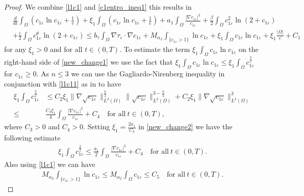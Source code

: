 \documentclass[a4paper,10pt]{article}
\theoremstyle{definition}
\begin{document}
\begin{proof}
 We combine \eqref{l1c1} and \eqref{c1entro_ineq1} this results in
\begin{align}
\label{new_change1}
   & \nonumber  \frac{d}{dt} \int_\Omega \left(c_{1\varepsilon} \ln c_{1\varepsilon} + \tfrac{1}{e}\right) + \xi_1  \int_\Omega \left(c_{1\varepsilon} \ln c_{1\varepsilon} + \tfrac{1}{e}\right) + a_1 \int_\Omega \frac{|\nabla c_{1\varepsilon}|^2}{c_{1\varepsilon}} + \frac{\beta}{2} \int_\Omega c_{1\varepsilon}^2 \ln(2 + c_{1\varepsilon}) \\[5pt]
  & + \frac{\varepsilon}{2} \int_\Omega c_{1\varepsilon}^\theta \ln(2 + c_{1\varepsilon})  \leq b_\tau \int_\Omega  \nabla \tau_\varepsilon \cdot \nabla c_{1\varepsilon} +  M_{\alpha_2}\int_{\{ c_{1\varepsilon} > 1\}} \ln c_{1\varepsilon} + \xi_1  \int_\Omega c_{1\varepsilon} \ln c_{1\varepsilon} + \xi_1 \frac{|\Omega|}{e} + C_1
\end{align}
for any $\xi_1 > 0$ and for all $t \in (0, T)$. To estimate the term $\xi_1  \int_\Omega c_{1\varepsilon} \ln c_{1\varepsilon}$ on the right-hand side of \eqref{new_change1} we use the fact that $\xi_1  \int_\Omega c_{1\varepsilon} \ln c_{1\varepsilon} \leq \xi_1 \int_\Omega c_{1\varepsilon}^{\frac{3}{2}}$ for $c_{1\varepsilon} \geq 0$. As $n \leq 3$ we can use the Gagliardo-Nirenberg inequality in conjunction with \eqref{l1c11} as in \cite[(3.19) with $q = \frac{3}{2}$]{tao2021global} to have
\begin{align}
  \label{new_change2}
  \nonumber \xi_1 \int_\Omega c_{1\varepsilon}^{\frac{3}{2}} & \leq C_2 \xi_1 \|\nabla \sqrt{c_{1\varepsilon}}\|^{\frac{n}{2}}_{L^2(\Omega)} \|\sqrt{c_{1\varepsilon}}\|^{3 - \frac{n}{2}}_{L^2(\Omega)} + C_2 \xi_1 \|\nabla \sqrt{c_{1\varepsilon}}\|^3_{L^2(\Omega)} \\[5pt]
  \leq & \frac{C_3 \xi_1}{4} \int_\Omega \frac{|\nabla c_{1\varepsilon}|^2}{c_{1\varepsilon}} + C_4 \quad \text{for all}~ t \in (0, T),
\end{align}
where $C_3 > 0$ and $C_4 > 0$. Setting $\xi_1 = \frac{2 a_1}{C_3}$ in \eqref{new_change2} we have the following estimate
\begin{align}
  \label{new_change3}
  \xi_1 \int_\Omega c_{1\varepsilon}^{\frac{3}{2}} \leq \frac{a_1}{2} \int_\Omega \frac{|\nabla c_{1\varepsilon}|^2}{c_{1\varepsilon}} + C_4 \quad \text{for all}~ t \in (0, T).
\end{align}
Also using \eqref{l1c1} we can have
\begin{align}
  \label{new_change4}
  M_{\alpha_2}\int_{\{ c_{1\varepsilon} > 1\}} \ln c_{1\varepsilon} \leq M_{\alpha_2} \int_\Omega c_{1\varepsilon} \leq C_5  \quad \text{for all}~ t \in (0, T).

\end{align}
\end{proof}
\end{document}
